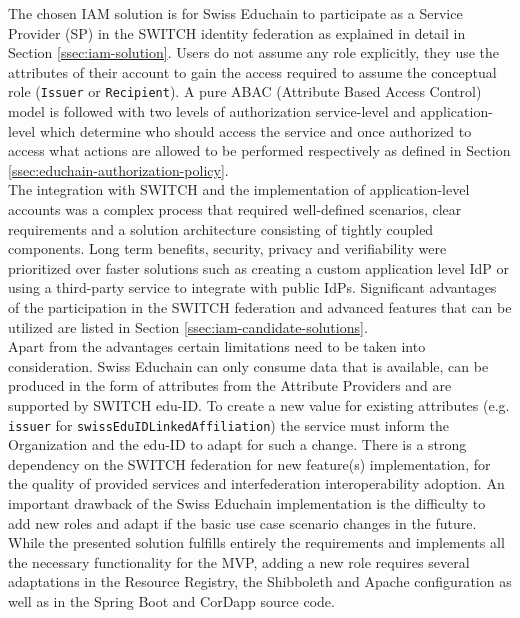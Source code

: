 The chosen IAM solution is for Swiss Educhain to participate as a Service Provider (SP) in the SWITCH identity federation as explained in detail in Section \ref{ssec:iam-solution}. Users do not assume any role explicitly, they use the attributes of their account to gain the access required to assume the conceptual role (\texttt{Issuer} or \texttt{Recipient}). A pure ABAC (Attribute Based Access Control) model is followed with two levels of authorization service-level and application-level which determine who should access the service and once authorized to access what actions are allowed to be performed respectively as defined in Section \ref{ssec:educhain-authorization-policy}.\\
The integration with SWITCH and the implementation of application-level accounts was a complex process that required well-defined scenarios, clear requirements and a solution architecture consisting of tightly coupled components. Long term benefits, security, privacy and verifiability were prioritized over faster solutions such as creating a custom application level IdP or using a third-party service to integrate with public IdPs. Significant advantages of the participation in the SWITCH federation and advanced features that can be utilized are listed in Section \ref{ssec:iam-candidate-solutions}. \\
Apart from the advantages certain limitations need to be taken into consideration. Swiss Educhain can only consume data that is available, can be produced in the form of attributes from the Attribute Providers and are supported by SWITCH edu-ID. To create a new value for existing attributes (e.g. \texttt{issuer} for \texttt{swissEduIDLinkedAffiliation}) the service must inform the Organization and the edu-ID to adapt for such a change. There is a strong dependency on the SWITCH federation for new feature(s) implementation, for the quality of provided services and interfederation interoperability adoption. An important drawback of the Swiss Educhain implementation is the difficulty to add new roles and adapt if the basic use case scenario changes in the future. While the presented solution fulfills entirely the requirements and implements all the necessary functionality for the MVP, adding a new role requires several adaptations in the Resource Registry, the Shibboleth and Apache configuration as well as in the Spring Boot and CorDapp source code. \\

